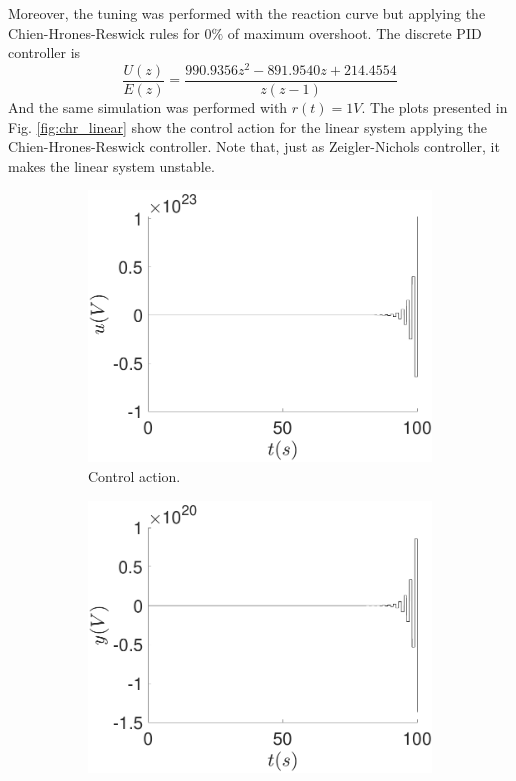 	Moreover, the tuning was performed with the reaction curve but applying the Chien-Hrones-Reswick rules for $0\%$ of maximum overshoot. The discrete PID controller is
	\begin{equation*}
	    \dfrac{U(z)}{E(z)}=\dfrac{990.9356z^2-891.9540z+214.4554}{z(z-1)}
	\end{equation*}
	And the same simulation was performed with $r(t)=1V$. The plots presented in Fig. \ref{fig:chr_linear} show the control action for the linear system applying the Chien-Hrones-Reswick controller. Note that, just as Zeigler-Nichols controller, it makes the linear system unstable.
	
	\begin{figure}
        \centering
        \begin{subfigure}[b]{0.475\textwidth}
            \centering
            \includegraphics[scale=0.425]{files/heuristic/CHR/plot_control_CHR_linear.pdf}
            \caption{Control action.}
        \end{subfigure}
        \vskip0.1cm
        \begin{subfigure}[b]{0.475\textwidth}   
            \centering 
            \includegraphics[scale=0.425]{files/heuristic/CHR/plot_y_CHR_linear.pdf}

\end{subfigure}
\end{figure}
